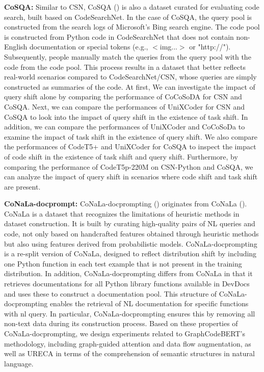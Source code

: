 \textbf{CoSQA: }
Similar to CSN, CoSQA (\cite{HuangTSG0J0D20}) is also a dataset curated for evaluating code search, 
built based on CodeSearchNet.
In the case of CoSQA, the query pool is constructed from the search logs of Microsoft's Bing search engine.
The code pool is constructed from Python code in CodeSearchNet 
that does not contain non-English documentation or special tokens (e.g., $<$img...$>$ or "http://").
Subsequently, people manually match the queries from the query pool with the code from the code pool.
This process results in a dataset that better reflects real-world scenarios compared to CodeSearchNet/CSN, 
whose queries are simply constructed as summaries of the code.
At first, We can investigate the impact of query shift alone 
by comparing the performance of CoCoSoDA for CSN and CoSQA.
Next, we can compare the performances of UniXCoder for CSN and CoSQA 
to look into the impact of query shift in the existence of task shift. 
In addition, we can compare the performances of UniXCoder and CoCoSoDa to examine the impact of task shift 
in the existence of query shift. 
We also compare the performances of CodeT5+ and UniXCoder for CoSQA to inspect the impact of code shift 
in the existence of task shift and query shift. 
Furthermore, by comparing the performance of CodeT5p-220M on CSN-Python and CoSQA, 
we can analyze the impact of query shift in scenarios where code shift and task shift are present.

\textbf{CoNaLa-docprompt: }
CoNaLa-docprompting (\cite{Zhou0XJN23}) originates from CoNaLa (\cite{PengchenBEBG18}).
CoNaLa is a dataset that recognizes the limitations of heuristic methods in dataset construction. 
It is built by curating high-quality pairs of NL queries and code, 
not only based on handcrafted features obtained through heuristic methods but also using features 
derived from probabilistic models.
CoNaLa-docprompting is a re-split version of CoNaLa, 
designed to reflect distribution shift by including one Python function in each test example 
that is not present in the training distribution.
In addition, CoNaLa-docprompting differs from CoNaLa in that it retrieves documentations 
for all Python library functions available in DevDocs and uses these to construct a documentation pool.
This structure of CoNaLa-docprompting enables the retrieval of NL documentation 
for specific functions with nl query.
In particular, CoNaLa-docprompting ensures this by removing all non-text data during its construction process.
Based on these properties of CoNaLa-docprompting, we design experiments related to GraphCodeBERT's methodology, 
including graph-guided attention and data flow augmentation, 
as well as URECA in terms of the comprehension of semantic structures in natural language.


